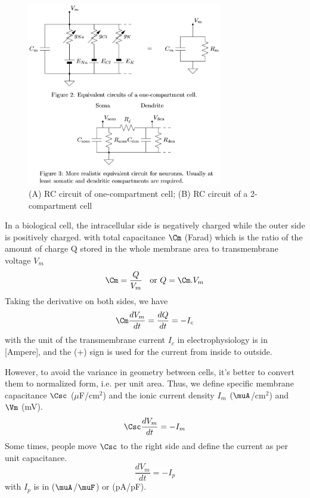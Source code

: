\begin{figure}[hbt]
  \centerline{\includegraphics[height=8cm,
    angle=0]{./images/RC-circuit.eps}}
\caption{(A) RC circuit of one-compartment cell; (B) RC circuit of a
2-compartment cell }
\label{fig:RC-circuit}
\end{figure}


In a biological cell, the intracellular side is negatively charged while the
outer side is positively charged.
with total capacitance $\Cm$ (Farad) which is the ratio of the amount of
charge Q stored in the whole membrane area to transmembrane voltage $V_m$
\begin{equation}
  \label{eq:687}
  \Cm=\frac{Q}{V_m} \; \; \text{ or } Q = \Cm.V_m
\end{equation}
Taking the derivative on both sides, we have
\begin{equation}
  \label{eq:688}
  \Cm\frac{dV_m}{dt}=\frac{dQ}{dt} = -I_c
\end{equation}
with the unit of the transmembrane current $I_c$ in electrophysiology is in
[Ampere], and the (+) sign is used for the current from inside to outside.


However, to avoid the variance in geometry between cells, it's better
to convert them to normalized form, i.e. per unit area. Thus, we define specific
membrane capacitance $\Csc$ ($\mu$F/cm$^2$) and the ionic current density
$I_m$  $(\muA$/cm$^2$) and $\Vm$ (mV).
\begin{equation}
  \label{eq:1256}
  \Csc \frac{dV_m}{dt} = -I_m
\end{equation}
Some times, people move $\Csc$ to the right side and define the current
as per unit capacitance.
\begin{equation}
  \label{eq:1257}
 \frac{dV_m}{dt} = -I_p
\end{equation}
with $I_p$ is in ($\muA$/$\muF$) or (pA/pF).

